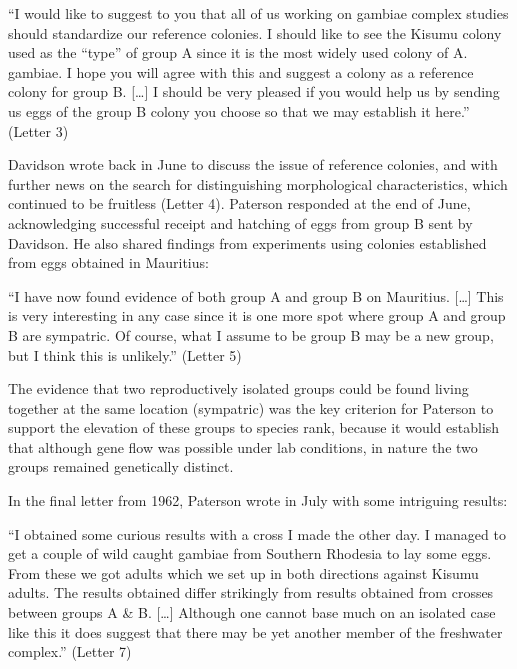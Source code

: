 \documentclass[a4paper,11pt,abstracton,hidelinks]{scrartcl}
\begin{document}
\begin{displayquote}
``I would like to suggest to you that all of us working on gambiae complex studies should standardize our reference colonies. I should like to see the Kisumu colony used as the ``type'' of group A since it is the most widely used colony of A. gambiae. I hope you will agree with this and suggest a colony as a reference colony for group B. [\ldots] I should be very pleased if you would help us by sending us eggs of the group B colony you choose so that we may establish it here.'' (Letter 3)
\end{displayquote}


Davidson wrote back in June to discuss the issue of reference colonies, and with further news on the search for distinguishing morphological characteristics, which continued to be fruitless (Letter 4).
%
Paterson responded at the end of June, acknowledging successful receipt and hatching of eggs from group B sent by Davidson.
%
He also shared findings from experiments using colonies established from eggs obtained in Mauritius:


\begin{displayquote}
``I have now found evidence of both group A and group B on Mauritius. [\ldots] This is very interesting in any case since it is one more spot where group A and group B are sympatric. Of course, what I assume to be group B may be a new group, but I think this is unlikely.'' (Letter 5)
\end{displayquote}


The evidence that two reproductively isolated groups could be found living together at the same location (sympatric) was the key criterion for Paterson to support the elevation of these groups to species rank, because it would establish that although gene flow was possible under lab conditions, in nature the two groups remained genetically distinct.


In the final letter from 1962, Paterson wrote in July with some intriguing results:


\begin{displayquote}
``I obtained some curious results with a cross I made the other day.
I managed to get a couple of wild caught gambiae from Southern Rhodesia to lay some eggs. From these we got adults which we set up in both directions against Kisumu adults. The results obtained differ strikingly from results obtained from crosses between groups A \& B. [\ldots] Although one cannot base much on an isolated case like this it does suggest that there may be yet another member of the freshwater complex.'' (Letter 7)
\end{displayquote}
\end{document}
